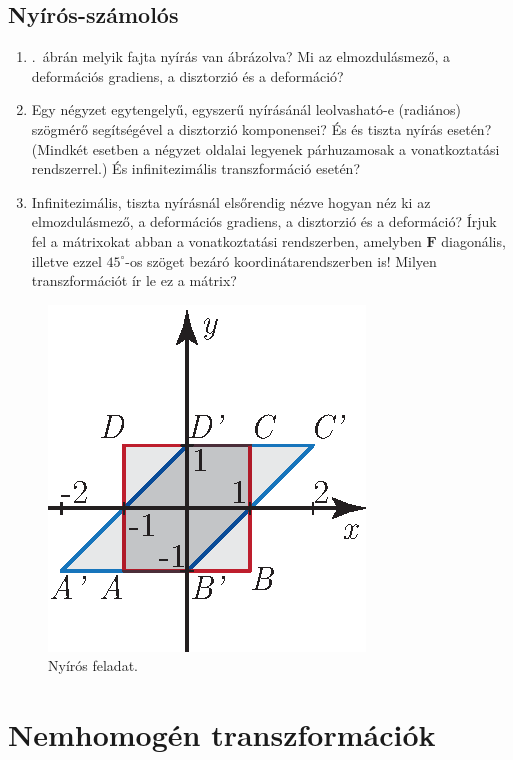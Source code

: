\documentclass[12pt,a4paper]{scrartcl}
\let\mathbf\bm
\begin{document}
\subsection{Nyírós-számolós}
\begin{enumerate}
\item {}.\ ábrán melyik fajta nyírás van ábrázolva? Mi az elmozdulásmező, a deformációs gradiens, a disztorzió és a deformáció?
\item Egy négyzet egytengelyű, egyszerű nyírásánál leolvasható-e (radiános) szögmérő segítségével a disztorzió komponensei? És és tiszta nyírás esetén? (Mindkét esetben a négyzet oldalai legyenek párhuzamosak a vonatkoztatási rendszerrel.) És infinitezimális transzformáció esetén?
\item Infinitezimális, tiszta nyírásnál elsőrendig nézve hogyan néz ki az elmozdulásmező, a deformációs gradiens, a disztorzió és a deformáció? Írjuk fel a mátrixokat abban a vonatkoztatási rendszerben, amelyben ${\mathbf{F}}$ diagonális, illetve ezzel $45^\circ$-os szöget bezáró koordinátarendszerben is! Milyen transzformációt ír le ez a mátrix?
\end{enumerate}


\begin{figure}[htb] 
\centering    
\includegraphics[scale=1]{figs/nyiras_feladat.eps}
\caption{Nyírós feladat.}
\label{fig:nyiras_feladat}
\end{figure}
\FloatBarrier

\iffalse




\section{Nemhomogén transzformációk}
\end{document}
